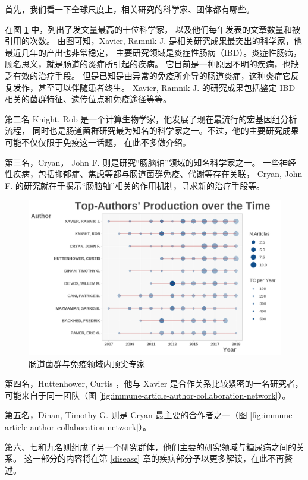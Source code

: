\documentclass[]{ctexbook}
\begin{document}
首先，我们看一下全球尺度上，相关研究的科学家、团体都有哪些。

在图 \ref{fig:immune-article-top-author} 中，列出了发文量最高的十位科学家，
以及他们每年发表的文章数量和被引用的次数。
由图可知，Xavier, Ramnik J. 是相关研究成果最突出的科学家，他最近几年的产出也非常稳定，
主要研究领域是炎症性肠病（IBD）。炎症性肠病，顾名思义，就是肠道的炎症所引起的疾病。
它目前是一种原因不明的疾病，也缺乏有效的治疗手段。
但是已知是由异常的免疫所介导的肠道炎症，这种炎症它反复发作，甚至可以伴随患者终生。
Xavier, Ramnik J. 的研究成果包括鉴定 IBD 相关的菌群特征、遗传位点和免疫途径等等。

第二名 Knight, Rob 是一个计算生物学家，他发展了现在最流行的宏基因组分析流程，
同时也是肠道菌群研究最为知名的科学家之一。不过，他的主要研究成果可能不仅仅限于免疫这一话题，
在此不多做介绍。

第三名，Cryan， John F. 则是研究``肠脑轴''领域的知名科学家之一。
一些神经性疾病，包括抑郁症、焦虑等都与肠道菌群免疫、代谢等存在关联，
Cryan, John F. 的研究就在于揭示``肠脑轴''相关的作用机制，寻求新的治疗手段等。

\begin{figure}
\includegraphics[width=1\linewidth]{plots/immune-article-top-author-1} \caption{肠道菌群与免疫领域内顶尖专家}\label{fig:immune-article-top-author}
\end{figure}

第四名，Huttenhower, Curtis ，他与 Xavier 是合作关系比较紧密的一名研究者，
可能来自于同一团队（图 \ref{fig:immune-article-author-collaboration-network}）。

第五名，Dinan, Timothy G. 则是 Cryan 最主要的合作者之一（图 \ref{fig:immune-article-author-collaboration-network}）。

第六、七和九名则组成了另一个研究群体，他们主要的研究领域与糖尿病之间的关系。
这一部分的内容将在第 \ref{disease} 章的疾病部分予以更多解读，在此不再赘述。
\end{document}
